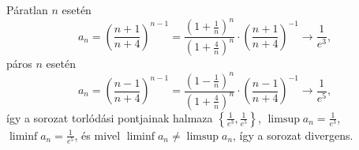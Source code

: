 \documentclass[11pt]{scrartcl}
\begin{document}
Páratlan $n$ esetén
\[
	a_n
	= \left( \frac{n + 1}{n + 4} \right)^{n - 1}
	= \frac{\left(1 + \frac{1}{n}\right)^n}{\left(1 + \frac{4}{n}\right)^n}
	\cdot \left( \frac{n + 1}{n + 4} \right)^{-1}
	\to \frac{1}{e^3},
\]
páros $n$ esetén
\[
	a_n
	= \left( \frac{n - 1}{n + 4} \right)^{n - 1}
	= \frac{\left(1 - \frac{1}{n}\right)^n}{\left(1 + \frac{4}{n}\right)^n}
	\cdot \left( \frac{n - 1}{n + 4} \right)^{-1}
	\to \frac{1}{e^5},
\]
így a sorozat torlódási pontjainak halmaza
$\left\{ \frac{1}{e^3}, \frac{1}{e^5} \right\}$,
$\limsup a_n = \frac{1}{e^3}$,
$\liminf a_n = \frac{1}{e^5}$, és mivel
$\liminf a_n \ne \limsup a_n$, így a sorozat divergens.
\end{document}
